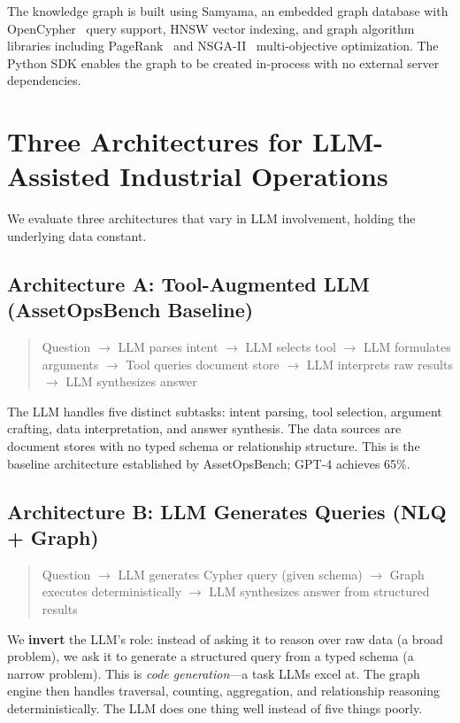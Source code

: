 \documentclass[11pt]{article}
\begin{document}
The knowledge graph is built using Samyama, an embedded graph database with OpenCypher~\citep{francis2018cypher} query support, HNSW vector indexing, and graph algorithm libraries including PageRank~\citep{page1999pagerank} and NSGA-II~\citep{deb2002nsga2} multi-objective optimization. The Python SDK enables the graph to be created in-process with no external server dependencies.

\section{Three Architectures for LLM-Assisted Industrial Operations}
\label{sec:architectures}

We evaluate three architectures that vary in LLM involvement, holding the underlying data constant.

\subsection{Architecture A: Tool-Augmented LLM (AssetOpsBench Baseline)}

\begin{quote}
Question $\to$ LLM parses intent $\to$ LLM selects tool $\to$ LLM formulates arguments $\to$ Tool queries document store $\to$ LLM interprets raw results $\to$ LLM synthesizes answer
\end{quote}

The LLM handles five distinct subtasks: intent parsing, tool selection, argument crafting, data interpretation, and answer synthesis. The data sources are document stores with no typed schema or relationship structure. This is the baseline architecture established by AssetOpsBench; GPT-4 achieves 65\%.

\subsection{Architecture B: LLM Generates Queries (NLQ + Graph)}
\label{sec:inverted-llm}

\begin{quote}
Question $\to$ LLM generates Cypher query (given schema) $\to$ Graph executes deterministically $\to$ LLM synthesizes answer from structured results
\end{quote}

We \textbf{invert} the LLM's role: instead of asking it to reason over raw data (a broad problem), we ask it to generate a structured query from a typed schema (a narrow problem). This is \emph{code generation}---a task LLMs excel at. The graph engine then handles traversal, counting, aggregation, and relationship reasoning deterministically. The LLM does one thing well instead of five things poorly.
\end{document}
